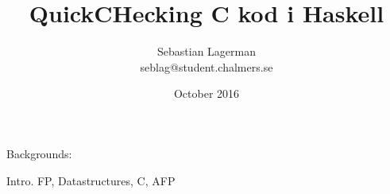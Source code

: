 \documentclass[10,twocolumn]{article}
\title{QuickCHecking C kod i Haskell}
\author{Sebastian Lagerman \\ seblag@student.chalmers.se}
\date{October 2016}
\begin{document}
\maketitle

Backgrounds:

Intro. FP, Datastructures, C, AFP











%



%
%
\end{document}
